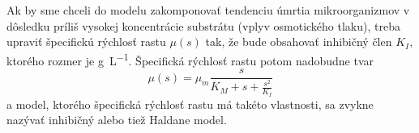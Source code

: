 Ak by sme chceli do modelu zakomponovať tendenciu úmrtia mikroorganizmov v dôsledku príliš vysokej koncentrácie substrátu (vplyv osmotického tlaku), treba upraviť špecifickú rýchlosť rastu $\mu(s)$ tak, že bude obsahovať inhibičný člen $ K_I $, ktorého rozmer je \si{\gram\per\liter}. Špecifická rýchlosť rastu potom nadobudne tvar
\begin{equation}
\mu(s) = \mu_{m}\frac{s}{K_{M} + s + \frac{s^2}{K_I}} \label{eq:spec_growth_rate_Haldane}
\end{equation}
a model, ktorého špecifická rýchlosť rastu má takéto vlastnosti, sa zvykne nazývať inhibičný alebo tiež Haldane model. 